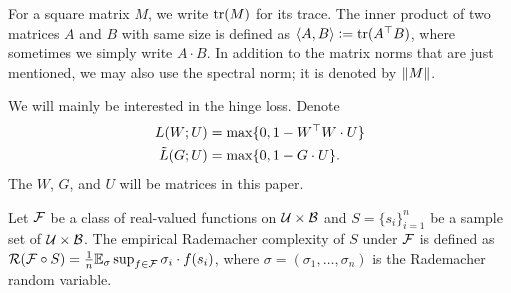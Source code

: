 For a square matrix $M$, we write $\mathrm{tr}(M)$ for its trace. The inner product of two matrices $A$ and $B$ with same size is defined as $\langle A, B \rangle := \mathrm{tr}(A^{\top} B)$, where sometimes we simply write $A \cdot B$. In addition to the matrix norms that are just mentioned, we may also use the spectral norm; it is denoted by $\left\lVert M \right\rVert$.

We will mainly be interested in the hinge loss. Denote
\begin{align}
L(W; U) &= \max\{0, 1 - W^{\top} W \cdot U\}\\
\tilde{L}(G; U) &=\max\{0, 1 - G \cdot U\}.
\end{align}
The $W$, $G$, and $U$ will be matrices in this paper.

Let $\mathcal{F}$ be a class of real-valued functions on $\mathcal{U} \times \mathcal{B}$ and $S = \{s_i\}_{i=1}^n$ be a sample set of $\mathcal{U} \times \mathcal{B}$. The empirical Rademacher complexity of $S$ under $\mathcal{F}$ is defined as $\mathcal{R}(\mathcal{F} \circ S) = \frac{1}{n} \mathbb{E}_{\sigma} \sup_{f \in \mathcal{F}} \sigma_i \cdot f(s_i)$, where $\sigma = (\sigma_1, \dots, \sigma_n)$ is the Rademacher random variable.
